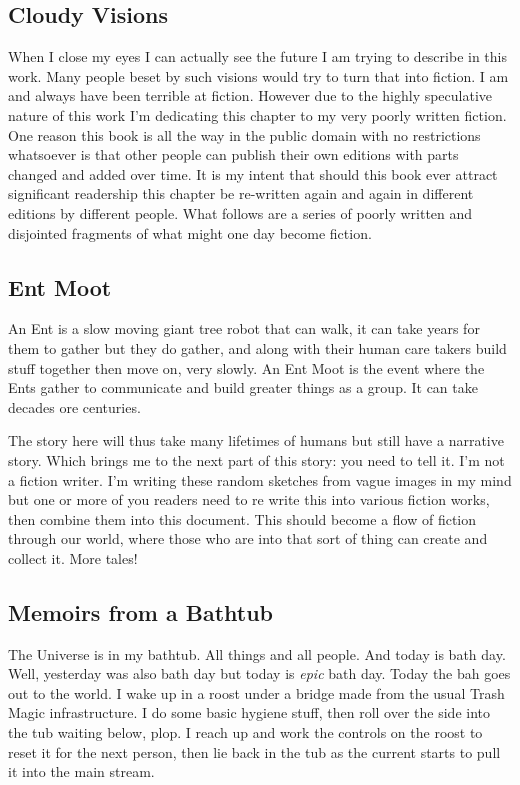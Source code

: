 \subsection{Cloudy Visions}\label{cloudy-visions}

When I close my eyes I can actually see the future I am trying to
describe in this work. Many people beset by such visions would try to
turn that into fiction. I am and always have been terrible at fiction.
However due to the highly speculative nature of this work I'm dedicating
this chapter to my very poorly written fiction. One reason this book is
all the way in the public domain with no restrictions whatsoever is that
other people can publish their own editions with parts changed and added
over time. It is my intent that should this book ever attract
significant readership this chapter be re-written again and again in
different editions by different people. What follows are a series of
poorly written and disjointed fragments of what might one day become
fiction.

\subsection{Ent Moot}\label{ent-moot}

An Ent is a slow moving giant tree robot that can walk, it can take
years for them to gather but they do gather, and along with their human
care takers build stuff together then move on, very slowly. An Ent Moot
is the event where the Ents gather to communicate and build greater
things as a group. It can take decades ore centuries.

The story here will thus take many lifetimes of humans but still have a
narrative story. Which brings me to the next part of this story: you
need to tell it. I'm not a fiction writer. I'm writing these random
sketches from vague images in my mind but one or more of you readers
need to re write this into various fiction works, then combine them into
this document. This should become a flow of fiction through our world,
where those who are into that sort of thing can create and collect it.
More tales!

\subsection{Memoirs from a Bathtub}\label{memoirs-from-a-bathtub}

The Universe is in my bathtub. All things and all people. And today is
bath day. Well, yesterday was also bath day but today is \emph{epic}
bath day. Today the bah goes out to the world. I wake up in a roost
under a bridge made from the usual Trash Magic infrastructure. I do some
basic hygiene stuff, then roll over the side into the tub waiting below,
plop. I reach up and work the controls on the roost to reset it for the
next person, then lie back in the tub as the current starts to pull it
into the main stream.


